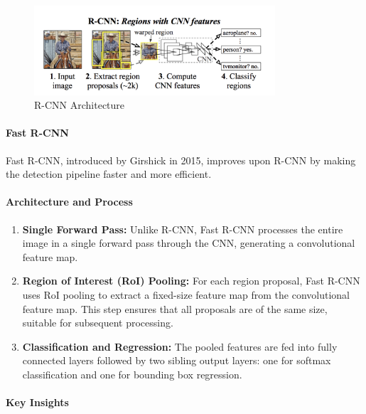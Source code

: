 \documentclass[12pt]{article}
\begin{document}
\begin{figure}[h]
    \centering
    \includegraphics[width=0.8\textwidth]{./media/rcnn.png}
    \caption{R-CNN Architecture}
    \label{fig:fast_rcnn}
\end{figure}

\paragraph{Fast R-CNN}

Fast R-CNN, introduced by Girshick in 2015, improves upon R-CNN by making the detection pipeline faster and more efficient.

\paragraph{Architecture and Process}

\begin{enumerate}
    \item \textbf{Single Forward Pass:} Unlike R-CNN, Fast R-CNN processes the entire image in a single forward pass through the CNN, generating a convolutional feature map.

    \item \textbf{Region of Interest (RoI) Pooling:} For each region proposal, Fast R-CNN uses RoI pooling to extract a fixed-size feature map from the convolutional feature map. This step ensures that all proposals are of the same size, suitable for subsequent processing.

    \item \textbf{Classification and Regression:} The pooled features are fed into fully connected layers followed by two sibling output layers: one for softmax classification and one for bounding box regression.
\end{enumerate}

\paragraph{Key Insights}
\end{document}
